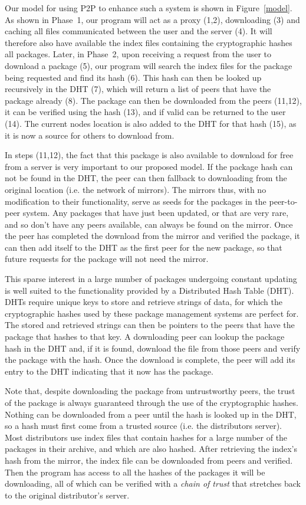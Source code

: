 \documentclass[conference]{IEEEtran}
\begin{document}
Our model for using P2P to enhance such a system is shown in
Figure~\ref{model}. As shown in Phase~1, our program will act as a
proxy (1,2), downloading (3) and caching all files communicated
between the user and the server (4). It will therefore also have
available the index files containing the cryptographic hashes all
packages. Later, in Phase~2, upon receiving a request from the user
to download a package (5), our program will search the index files
for the package being requested and find its hash (6). This hash can
then be looked up recursively in the DHT (7), which will return a
list of peers that have the package already (8). The package can
then be downloaded from the peers (11,12), it can be verified using
the hash (13), and if valid can be returned to the user (14). The
current nodes location is also added to the DHT for that hash (15),
as it is now a source for others to download from.

In steps (11,12), the fact that this package is also available to download for free
from a server is very important to our proposed model. If the package hash
can not be found in the DHT, the peer can then fallback to
downloading from the original location (i.e. the network of
mirrors). The mirrors thus, with no modification to their
functionality, serve as seeds for the packages in the peer-to-peer
system. Any packages that have just been updated, or that are very
rare, and so don't have any peers available, can always be found on
the mirror. Once the peer has completed the download from the mirror
and verified the package, it can then add itself to the DHT as the
first peer for the new package, so that future requests for the package
will not need the mirror.

This sparse
interest in a large number of packages undergoing constant updating
is well suited to the functionality provided by a Distributed Hash
Table (DHT). DHTs require unique keys to store and retrieve strings
of data, for which the cryptographic hashes used by these package
management systems are perfect for. The stored and retrieved strings
can then be pointers to the peers that have the package that hashes
to that key. A downloading peer can lookup the package hash in the
DHT and, if it is found, download the file from those peers and
verify the package with the hash. Once the download is complete, the
peer will add its entry to the DHT indicating that it now has the
package.

Note that, despite downloading the package from untrustworthy peers,
the trust of the package is always guaranteed through the use
of the cryptographic hashes. Nothing can be downloaded from a peer
until the hash is looked up in the DHT, so a hash must first come
from a trusted source (i.e. the distributors server). Most distributors use index
files that contain hashes for a large number of the packages in
their archive, and which are also hashed. After retrieving the
index's hash from the mirror, the index file can be downloaded from
peers and verified. Then the program has access to all the hashes of
the packages it will be downloading, all of which can be verified
with a \emph{chain of trust} that stretches back to the original
distributor's server.
\end{document}
